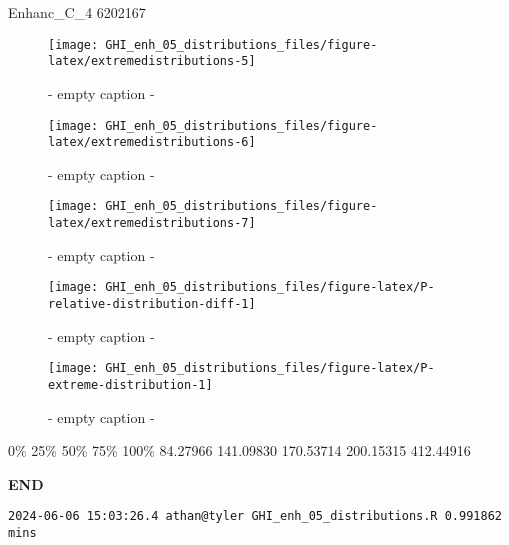 \documentclass[
  10pt,
  a4paper,oneside]{article}
\begin{document}
Enhanc\_C\_4
6202167

\begin{figure}[H]

{\centering \texttt{[image: GHI\_enh\_05\_distributions\_files/figure-latex/extremedistributions-5]} 

}

\caption{ - empty caption - }\label{fig:extremedistributions-5}
\end{figure}
\begin{figure}[H]

{\centering \texttt{[image: GHI\_enh\_05\_distributions\_files/figure-latex/extremedistributions-6]} 

}

\caption{ - empty caption - }\label{fig:extremedistributions-6}
\end{figure}
\begin{figure}[H]

{\centering \texttt{[image: GHI\_enh\_05\_distributions\_files/figure-latex/extremedistributions-7]} 

}

\caption{ - empty caption - }\label{fig:extremedistributions-7}
\end{figure}
\begin{figure}[H]

{\centering \texttt{[image: GHI\_enh\_05\_distributions\_files/figure-latex/P-relative-distribution-diff-1]} 

}

\caption{ - empty caption - }\label{fig:P-relative-distribution-diff}
\end{figure}
\begin{figure}[H]

{\centering \texttt{[image: GHI\_enh\_05\_distributions\_files/figure-latex/P-extreme-distribution-1]} 

}

\caption{ - empty caption - }\label{fig:P-extreme-distribution}
\end{figure}

0\% 25\% 50\% 75\% 100\%
84.27966 141.09830 170.53714 200.15315 412.44916

\textbf{END}

\begin{verbatim}
2024-06-06 15:03:26.4 athan@tyler GHI_enh_05_distributions.R 0.991862 mins
\end{verbatim}
\end{document}
